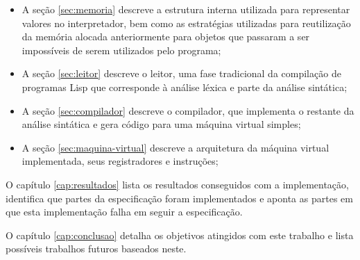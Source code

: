 \begin{itemize}

\item A seção \ref{sec:memoria} descreve a estrutura interna utilizada para
representar valores no interpretador, bem como as estratégias utilizadas para
reutilização da memória alocada anteriormente para objetos que passaram a ser
impossíveis de serem utilizados pelo programa;

\item A seção \ref{sec:leitor} descreve o leitor, uma fase tradicional da
compilação de programas Lisp que corresponde à análise léxica e parte da
análise sintática;

\item A seção \ref{sec:compilador} descreve o compilador, que implementa o
restante da análise sintática e gera código para uma máquina virtual simples;

\item A seção \ref{sec:maquina-virtual} descreve a arquitetura da máquina
virtual implementada, seus registradores e instruções;


\end{itemize}

O capítulo \ref{cap:resultados} lista os resultados conseguidos com a
implementação, identifica que partes da especificação foram implementados e
aponta as partes em que esta implementação falha em seguir a especificação.

O capítulo \ref{cap:conclusao} detalha os objetivos atingidos com este trabalho
e lista possíveis trabalhos futuros baseados neste.

